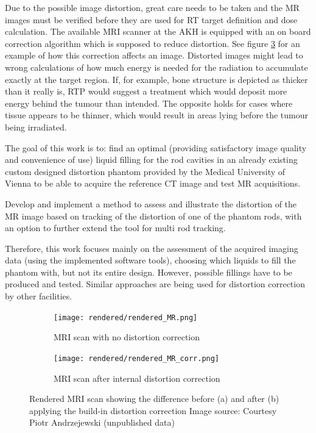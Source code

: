 Due to the possible image distortion, great care needs to be taken and the MR images must be verified before they are used for RT target definition and dose calculation.
The available MRI scanner at the AKH is equipped with an on board correction algorithm which is supposed to reduce distortion.
See figure \ref{fig:rendered_dist} for an example of how this correction affects an image.
Distorted images might lead to wrong calculations of how much energy is needed for the radiation to accumulate exactly at the target region.
If, for example, bone structure is depicted as thicker than it really is, RTP would suggest a treatment which would deposit more energy behind the tumour than intended.
The opposite holds for cases where tissue appears to be thinner, which would result in areas lying before the tumour being irradiated.

The goal of this work is to:
find an optimal (providing satisfactory image quality and convenience of use) liquid filling for the rod cavities in an already existing custom designed distortion phantom provided by the Medical University of Vienna to be able to acquire the reference CT image and test MR acquisitions.

Develop and implement a method to assess and illustrate the distortion of the MR image based on tracking of the distortion of one of the phantom rods, with an option to further extend the tool for multi rod tracking.

Therefore, this work focuses mainly on the assessment of the acquired imaging data (using the implemented software tools), choosing which liquids to fill the phantom with, but not its entire design.
However, possible fillings have to be produced and tested.
Similar approaches are being used for distortion correction by other facilities. \cite{Price2015, Petersch2004, Torfeh2015, Wang2004, Wang2004a, Mizowaki2000}


\begin{figure}[!thb]
\centering
  \begin{subfigure}[b]{0.49\textwidth}
  \centering
    \texttt{[image: rendered/rendered\_MR.png]}
    \caption{MRI scan with no distortion correction}
    \label{fig:rendered_MR}
  \end{subfigure}
  \begin{subfigure}[b]{0.49\textwidth}
  \centering
      \texttt{[image: rendered/rendered\_MR\_corr.png]}
    \caption{MRI scan after internal distortion correction}
    \label{fig:rendered_MR_corr}
  \end{subfigure}
  \caption[Rendered MR image before and after applying build-in distortion correction. Image source: Courtesy Piotr Andrzejewski (unpublished data)]{Rendered MRI scan showing the difference before (a) and after (b) applying the build-in distortion correction Image source: Courtesy Piotr Andrzejewski (unpublished data)}
  \label{fig:rendered_dist}
\end{figure}


